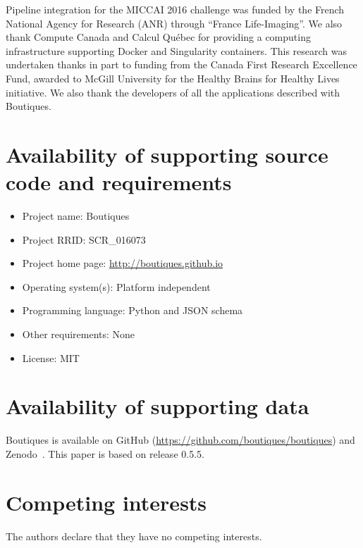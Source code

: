 \documentclass[a4paper,num-refs]{oup-contemporary}
\newcommand{\boutiques}{Boutiques\xspace}
\begin{document}
Pipeline integration for the MICCAI 2016 challenge was funded by the
French National Agency for Research (ANR) through ``France
Life-Imaging''. We also thank Compute Canada and Calcul Québec for
providing a computing infrastructure supporting Docker and Singularity
containers. This research was undertaken thanks in part to funding
from the Canada First Research Excellence Fund, awarded to McGill
University for the Healthy Brains for Healthy Lives initiative. We also
thank the developers of all the applications described with \boutiques.

\section{Availability of supporting source code and requirements}
\begin{itemize}
\item Project name: Boutiques
\item Project RRID: SCR\_016073
\item Project home page: \url{http://boutiques.github.io}
\item Operating system(s): Platform independent
\item Programming language: Python and JSON schema
\item Other requirements: None
\item License: MIT
\end{itemize}

\section{Availability of supporting data}

Boutiques is available on GitHub (\url{https://github.com/boutiques/boutiques}) and Zenodo~\cite{tristan_glatard_2018_1164290}. This paper is based on release 0.5.5.

\section{Competing interests}

The authors declare that they have no competing interests.


\end{document}
